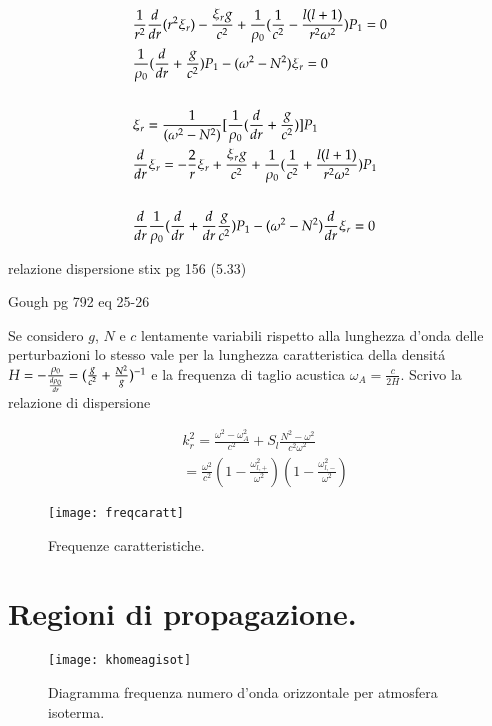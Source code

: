 \documentclass[../main.tex]{subfiles}
\begin{document}
\begin{align*}
&\frac{1}{r^2}\TDof{r}(r^2\xi_r)-\frac{\xi_rg}{c^2}+\frac{1}{\rho_0}(\frac{1}{c^2}-\frac{l(l+1)}{r^2\omega^2})P_1=0\\
&\frac{1}{\rho_0}(\TDof{r}+\frac{g}{c^2})P_1-(\omega^2-N^2)\xi_r=0\\
\\
&\xi_r=\frac{1}{(\omega^2-N^2)}[\frac{1}{\rho_0}(\TDof{r}+\frac{g}{c^2})]P_1\\
&\TDof{r}\xi_r=-\frac{2}{r}\xi_r+\frac{\xi_rg}{c^2}+\frac{1}{\rho_0}(\frac{1}{c^2}+\frac{l(l+1)}{r^2\omega^2})P_1\\
\\
&\TDof{r} \frac{1}{\rho_0}(\TDof{r}+\TDof{r} \frac{g}{c^2})P_1-(\omega^2-N^2)\TDof{r} \xi_r=0
\end{align*}

\begin{todo}{relazione dispersione stix pg 156 (5.33)}

Gough pg 792 eq 25-26

\end{todo}

Se considero $g$, $N$ e $c$ lentamente variabili rispetto alla lunghezza d'onda delle perturbazioni lo stesso vale per la lunghezza caratteristica della densit\'a $H=-\frac{\rho_0}{\TDy{r}{\rho_0}}=(\frac{g}{c^2}+\frac{N^2}{g})\expy{-1}$ e la frequenza di taglio acustica $\omega_A=\frac{c}{2H}$. Scrivo la relazione di dispersione

\begin{align}
&k_r^2=\frac{\omega^2-\omega_A^2}{c^2}+S_l\frac{N^2-\omega^2}{c^2\omega^2}\label{eq:localdispersion}\\
&=\frac{\omega^2}{c^2}(1-\frac{\omega_{l,+}^2}{\omega^2})(1-\frac{\omega_{l,-}^2}{\omega^2})\nonumber
\end{align}

\begin{figure}[!ht]
\centering
\texttt{[image: freqcaratt]}
\caption{Frequenze caratteristiche.}
\label{fig:freqcaratt}
\end{figure}

\clearpage


\section{Regioni di propagazione.}

\begin{figure}[!ht]
\centering
\texttt{[image: khomeagisot]}
\caption{Diagramma frequenza numero d'onda orizzontale per atmosfera isoterma.}
\label{fig:khomeagisot}
\end{figure}
\end{document}
